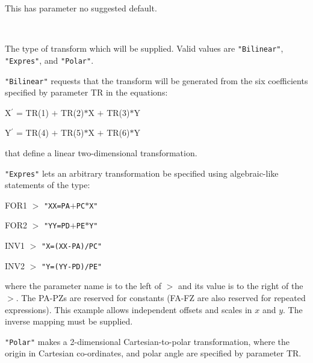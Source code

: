 \documentclass[twoside,11pt]{article}
\newcommand{\sstsubsection}[1]{ \item[{#1}] \mbox{} \\}
\newcommand{\sstsubsection}[1]{\item[{#1}]}
\begin{document}
{{{         This has parameter no suggested default.
      }
      \sstsubsection{
         TRTYPE = LITERAL (Read)
      }{
         The type of transform which will be supplied.  Valid values are
         {\tt "Bilinear"}, {\tt "Expres"}, and {\tt "Polar"}.

         {\tt "Bilinear"} requests that the transform will be generated from
         the six coefficients specified by parameter TR in the
         equations:
         \begin{description}
         \item X$^\prime$ = TR(1) $+$ TR(2)$*$X $+$ TR(3)$*$Y
         \item Y$^\prime$ = TR(4) $+$ TR(5)$*$X $+$ TR(6)$*$Y
         \end{description}
         that define a linear two-dimensional transformation.

         {\tt "Expres"} lets an arbitrary transformation be specified
         using algebraic-like statements of the type:
         \begin{description}
         \item  FOR1 $>$ {\tt "XX=PA$+$PC$*$X"}
         \item  FOR2 $>$ {\tt "YY=PD$+$PE$*$Y"}
         \item  INV1 $>$ {\tt "X=(XX-PA)/PC"}
         \item  INV2 $>$ {\tt "Y=(YY-PD)/PE"}
         \end{description}
         where the parameter name is to the left of $>$ and its value is
         to the right of the $>$.  The PA-PZs are reserved for constants
         (FA-FZ are also reserved for repeated expressions).  This
         example allows independent offsets and scales in $x$ and $y$.  The
         inverse mapping must be supplied.

         {\tt "Polar"} makes a 2-dimensional Cartesian-to-polar
         transformation, where the origin in Cartesian co-ordinates, and
         polar angle are specified by parameter TR.

}}}
\end{document}
